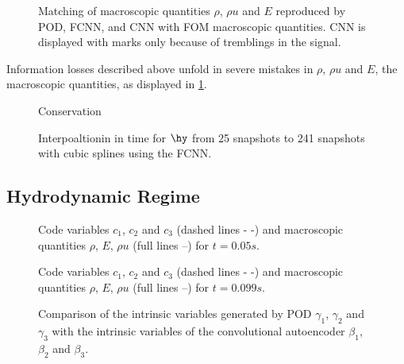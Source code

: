 \begin{figure}[htbp!]
	
	\caption{Matching of macroscopic quantities \(\rho\), \(\rho u\) and \(E\) reproduced by POD, FCNN, and CNN with FOM macroscopic quantities. CNN is displayed with marks only because of tremblings in the signal.}
	\label{Fig:ErrMacro}
\end{figure}
Information losses described above unfold in severe mistakes in \(\rho\), \(\rho u\) and \(E\), the macroscopic quantities, as displayed in \cref{Fig:ErrMacro}. 
\begin{figure}
	
	\caption{Conservation}
\end{figure}
\begin{figure}
	
	\caption{Interpoaltionin in time for \(\hy\) from 25 snapshots to 241 snapshots with cubic splines using the FCNN.}
\end{figure}
\subsection{Hydrodynamic Regime}

\begin{figure}[!htbp]
	\scalebox{1}{}
	\caption{Code variables \(c_1\), \(c_2\) and \(c_3\) (dashed lines - -) and macroscopic quantities \(\rho\), \(E\), \(\rho u\) (full lines --) for \(t=0.05s\).}
\end{figure}
\begin{figure}[!htbp]
	\scalebox{1}{}
	\caption{Code variables \(c_1\), \(c_2\) and \(c_3\) (dashed lines - -) and macroscopic quantities \(\rho\), \(E\), \(\rho u\) (full lines --) for \(t=0.099s\).}
\end{figure}
\begin{figure}[!htbp]
	\scalebox{.6}{}
	\caption{Comparison of the intrinsic variables generated by POD \(\gamma_1\), \(\gamma_2\) and \(\gamma_3\) with the intrinsic variables of the convolutional autoencoder \(\beta_1\), \(\beta_2\) and \(\beta_3\).}
\end{figure}


